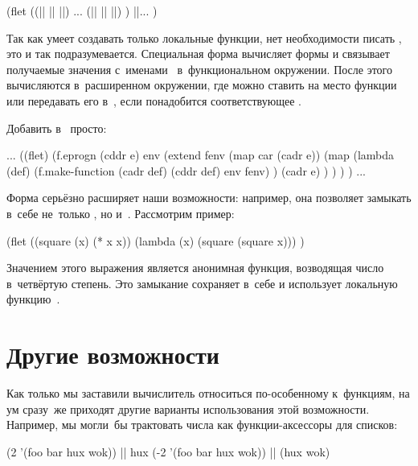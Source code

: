 \begin{code:lisp}
(flet ((|| || ||)
        ...
       (|| || ||) )
  ||... )
\end{code:lisp}

Так как  умеет создавать только локальные функции, нет необходимости
писать , это и так подразумевается. Специальная форма 
вычисляет формы  и связывает
получаемые значения с~именами~ в~функциональном окружении. После
этого  вычисляются в~расширенном окружении, где можно ставить
 на место функции или передавать его в~, если
понадобится соответствующее .

Добавить  в~ просто:

\begin{code:lisp}
...
((flet)
 (f.eprogn
  (cddr e)
  env
  (extend fenv
          (map car (cadr e))
          (map (lambda (def)
                 (f.make-function (cadr def) (cddr def) env fenv) )
               (cadr e) ) ) ) ) ...
\end{code:lisp}

Форма  серьёзно расширяет наши возможности: например, она позволяет
 замыкать в~себе не~только , но и~. Рассмотрим
пример:

\begin{code:lisp}
(flet ((square (x) (* x x))
  (lambda (x) (square (square x))) )
\end{code:lisp}

Значением этого выражения является анонимная функция, возводящая число
в~четвёртую степень. Это замыкание сохраняет в~себе и использует локальную
функцию~.


\section{Другие возможности}\label{lisp1-2-omega/sect:extensions}

Как только мы заставили вычислитель относиться по-особенному к~функциям, на ум
сразу~же приходят другие варианты использования этой возможности. Например, мы
могли~бы трактовать числа как функции-аксессоры для списков:

\begin{code:lisp}
(2 '(foo bar hux wok))  |\is| hux
(-2 '(foo bar hux wok)) |\is| (hux wok)
\end{code:lisp}

